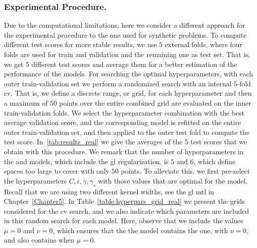 \subsubsection*{Experimental Procedure.}
Due to the computational limitations, here we consider a different approach for the experimental procedure to the one used for synthetic problems.
To compute different test scores for more stable results, we use $5$ external folds, where four folds are used for train and validation and the remaining one as test set.
That is, we get $5$ different test scores and average them for a better estimation of the performance of the models. 
%
For searching the optimal hyperparameters, with each outer train-validation set we perform a randomized search with an internal $5$-fold \acrshort{cv}. That is, we define a discrete range, or grid, for each hyperparameter and then a maximum of $50$ points over the entire combined grid are evaluated on the inner train-validation folds.
%
We select the hyperparameter combination with the best average validation score, and the corresponding model is refitted on the entire outer train-validation set, and then applied to the outer test fold to compute the test score. In~\ref{tab:results_real} we give the averages of the $5$ test scores that we obtain with this procedure.
%
We remark that the number of hyperparameters in the  and  models, which include the \acrshort{gl} regularization, is $5$ and $6$, which define spaces too large to cover with only $50$ points. To alleviate this, we first pre-select the hyperparameters $C, \epsilon, \gamma, \gamma_s$ with those values that are optimal for the  model. Recall that we are using two different kernel widths, see the \acrshort{gl} \acrshort{mtl} in Chapter~\ref{Chapter5}.
%
In Table~\ref{table:hyperpars_grid_real} we present the grids considered for the \acrshort{cv} search, and we also indicate which parameters are included in this random search for each model.
Here, observe that we include the values $\mu=0$ and $\nu=0$, which ensures that the the  model contains the  one, with $\nu=0$, and also  contains  when $\mu=0$.
%


